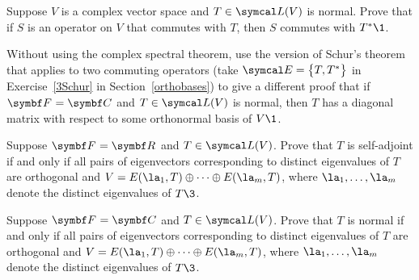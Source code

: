 \begin{exercises}
\exercise
Suppose $V$ is a complex vector space and $T \in \L(V)$ is normal. Prove that if $S$ is an operator on $V$ that commutes with $T$, then $S$ commutes with $T^*\1$.

\exercise
Without using the complex spectral theorem, use the version of Schur's theorem that applies to two commuting operators \big(take
$\E = \br[\big]{T, T^*}$ in Exercise~\ref{3Schur} in Section~\ref{orthobases}\big) to give a different proof that if $\F{} = \C{}$ and $T \in \L(V)$ is normal, then $T$ has a diagonal matrix with respect to some orthonormal basis of $V\1$.\label{AltCST}


\exercise
Suppose $\F{} = \R{}$ and $T \in \L(V)$. Prove that $T$ is self-adjoint if and  only if all pairs of eigenvectors corresponding to distinct eigenvalues of $T$ are orthogonal and
$
V = E(\la_1, T) \oplus \dots \oplus E(\la_m, T)$,
where $\la_1, \dots, \la_m$ denote the distinct eigenvalues of $T\3$.\label{7dirsum}


\exercise
Suppose $\F{} = \C{}$ and $T \in \L(V)$. Prove that $T$ is normal if and  only if all pairs of eigenvectors corresponding to distinct eigenvalues of $T$ are orthogonal and\label{7dirsum2}
$
V = E(\la_1, T) \oplus \dots \oplus E(\la_m, T)$,
where $\la_1, \dots, \la_m$ denote the distinct eigenvalues of $T\3$.



\end{exercises}

